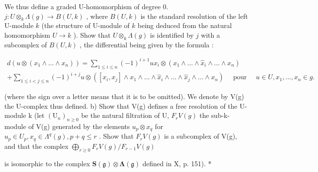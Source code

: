 We thus define a graded U-homomorphism of degree 0. \(j:U\otimes_{k}\Lambda(g)\to B(U,k)\) , where \(B(U,k)\) is the standard resolution of the left U-module \(k\) (the structure of U-module of \(k\) being deduced from the natural homomorphism \(U\to k\) ). Show that \(U\otimes_{k}\Lambda(g)\) is identified by \(j\) with a subcomplex of \(B(U,k)\) , the differential being given by the formula :

\[
\begin{array}{l} d (u \otimes (x _ {1} \wedge \dots \wedge x _ {n})) = \sum_ {1 \leqslant i \leqslant n} (- 1) ^ {i + 1} u x _ {i} \otimes (x _ {1} \wedge \dots \wedge \hat {x} _ {i} \wedge \dots \wedge x _ {n}) \\ + \sum_ {1 \leqslant i <   j \leqslant n} (- 1) ^ {i + j} u \otimes ([ x _ {i}, x _ {j} ] \wedge x _ {1} \wedge \dots \wedge \hat {x} _ {i} \wedge \dots \wedge \hat {x} _ {j} \wedge \dots \wedge x _ {n}) \quad \text { pour } \quad u \in U, x _ {1},..., x _ {n} \in g. \end{array}
\]

(where the sign over a letter means that it is to be omitted). We denote by V(g) the U-complex thus defined. b) Show that V(g) defines a free resolution of the U-module k (let \((\mathrm{U}_{n})_{n\geqslant0}\) be the natural filtration of U, \(F_{r}V(g)\) the sub-k-module of V(g) generated by the elements \(u_{p}\otimes x_{q}\) for \(u_{p}\in U_{p}, x_{q}\in\Lambda^{q}(g), p+q\leqslant r\) . Show that \(F_{r}V(g)\) is a subcomplex of V(g), and that the complex \(\bigoplus_{r\geqslant0}F_{r}V(g)/F_{r-1}V(g)\)

is isomorphic to the complex \(\mathbf{S}(\mathfrak{g})\otimes\symbf{\Lambda}(\mathfrak{g})\) defined in X, p. 151). *
\relax{}
